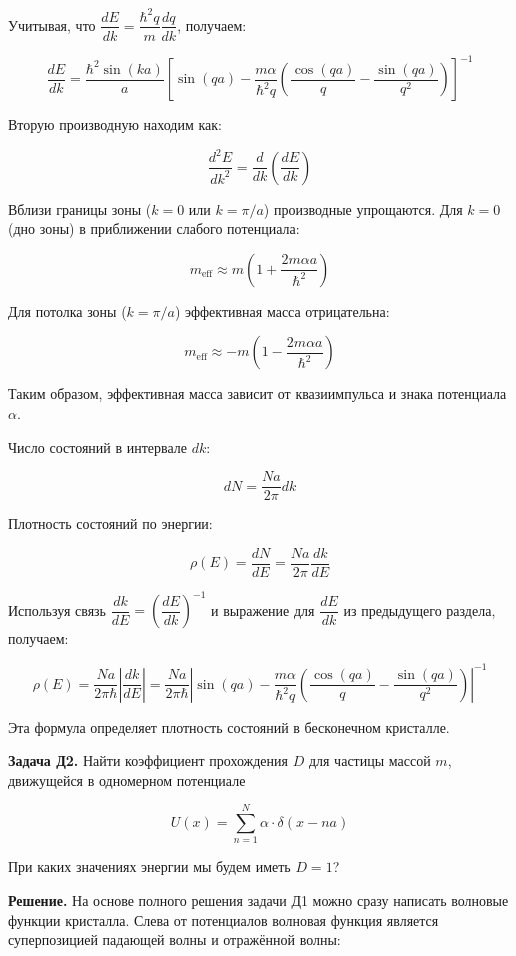\documentclass[a4paper, 12pt]{article}
\begin{document}
	\quad Учитывая, что $\dfrac{dE}{dk} = \dfrac{\hbar^2 q}{m} \dfrac{dq}{dk}$, получаем:
	
	\[
	\dfrac{dE}{dk} = \dfrac{\hbar^2 \sin(ka)}{a} \left[ \sin(qa) - \dfrac{m\alpha}{\hbar^2 q} \left( \dfrac{\cos(qa)}{q} - \dfrac{\sin(qa)}{q^2} \right) \right]^{-1}
	\]
	
	\quad Вторую производную находим как:
	
	\[
	\dfrac{d^2E}{dk^2} = \dfrac{d}{dk} \left( \dfrac{dE}{dk} \right)
	\]
	
	\quad Вблизи границы зоны ($k=0$ или $k=\pi/a$) производные упрощаются. Для $k=0$ (дно зоны) в приближении слабого потенциала:
	
	\[
	m_{\text{eff}} \approx m \left( 1 + \dfrac{2m\alpha a}{\hbar^2} \right)
	\]
	
	\quad Для потолка зоны ($k=\pi/a$) эффективная масса отрицательна:
	
	\[
	m_{\text{eff}} \approx -m \left( 1 - \dfrac{2m\alpha a}{\hbar^2} \right)
	\]
	
	\quad Таким образом, эффективная масса зависит от квазиимпульса и знака потенциала $\alpha$.
	
	\quad Число состояний в интервале $dk$:
	
	\[
	dN = \dfrac{Na}{2\pi} dk
	\]
	
	\quad Плотность состояний по энергии:
	
	\[
	\rho(E) = \dfrac{dN}{dE} = \dfrac{Na}{2\pi} \dfrac{dk}{dE}
	\]
	
	\quad Используя связь $\dfrac{dk}{dE} = \left( \dfrac{dE}{dk} \right)^{-1}$ и выражение для $\dfrac{dE}{dk}$ из предыдущего раздела, получаем:
	
	\[
	\rho(E) = \dfrac{Na}{2\pi\hbar} \left| \dfrac{dk}{dE} \right| = \dfrac{Na}{2\pi\hbar} \left| \sin(qa) - \dfrac{m\alpha}{\hbar^2 q} \left( \dfrac{\cos(qa)}{q} - \dfrac{\sin(qa)}{q^2} \right) \right|^{-1}
	\]
	
	\quad Эта формула определяет плотность состояний в бесконечном кристалле.
	
	
	\quad \textbf{Задача Д2.} Найти коэффициент прохождения \( D \) для частицы массой \( m \), движущейся в одномерном потенциале  
	
	\[
	U(x) = \sum_{n=1}^{N} \alpha \cdot \delta (x - na)
	\]
	
	При каких значениях энергии мы будем иметь \( D = 1 \)?
	
	\quad \textbf{Решение.} На основе полного решения задачи Д1 можно сразу написать волновые функции кристалла. Слева от потенциалов волновая функция является суперпозицией падающей волны и отражённой волны: 
	
\end{document}

